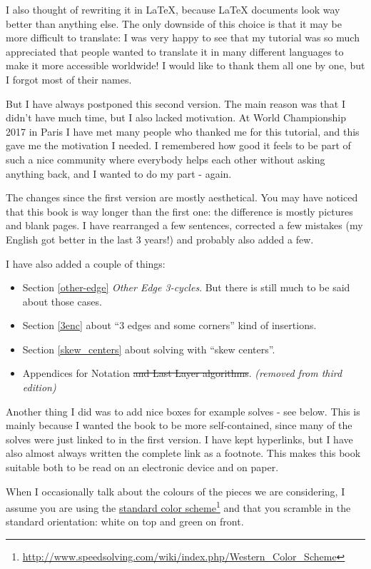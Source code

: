 \documentclass[11pt,a4paper]{book}
\begin{document}
I also thought of rewriting it in LaTeX, because LaTeX documents look way better than anything else. The only downside of this choice is that it may be more difficult to translate: I was very happy to see that my tutorial was so much appreciated that people wanted to translate it in many different languages to make it more accessible worldwide! I would like to thank them all one by one, but I forgot most of their names.

But I have always postponed this second version. The main reason was that I didn't have much time, but I also lacked motivation. At World Championship 2017 in Paris I have met many people who thanked me for this tutorial, and this gave me the motivation I needed. I remembered how good it feels to be part of such a nice community where everybody helps each other without asking anything back, and I wanted to do my part - again.

\bigskip
The changes since the first version are mostly aesthetical. You may have noticed that this book is way longer than the first one: the difference is mostly pictures and blank pages. I have rearranged a few sentences, corrected a few mistakes (my English got better in the last 3 years!) and probably also added a few.

I have also added a couple of things:

\begin{itemize}
\item Section \ref{other-edge} \emph{Other Edge 3-cycles}. But there is still much to be said about those cases.
\item Section \ref{3enc} about ``3 edges and some corners'' kind of insertions.
\item Section \ref{skew_centers} about solving with ``skew centers''.
\item Appendices for Notation \sout{and Last Layer algorithms}. \emph{(removed from third edition)}
\end{itemize}

Another thing I did was to add nice boxes for example solves - see below. This is mainly because I wanted the book to be more self-contained, since many of the solves were just linked to in the first version. I have kept hyperlinks, but I have also almost always written the complete link as a footnote. This makes this book suitable both to be read on an electronic device and on paper.

When I occasionally talk about the colours of the pieces we are considering, I assume you are using the \href{http://www.speedsolving.com/wiki/index.php/Western\_Color\_Scheme}{standard color scheme}\footnote{\url{http://www.speedsolving.com/wiki/index.php/Western\_Color\_Scheme}} and that you scramble in the standard orientation: white on top and green on front.
\end{document}
